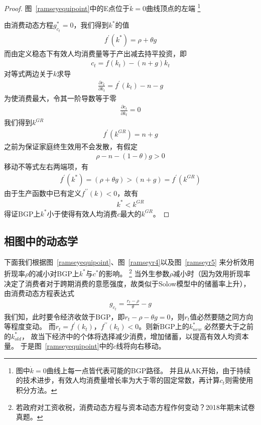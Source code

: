 \documentclass[cn,normal,11pt,black]{elegantnote}
\begin{document}
\begin{proof}{图~\ref{ramseyequipoint}中的E点位于$\dot{k} = 0$曲线顶点的左端}
        \footnote{图中$\dot{k} =0$曲线上每一点皆代表可能的BGP路径。
        并且从AK开始，由于持续的技术进步，有效人均消费量增长率为大于零的固定常数，再计算$c_t$则需使用积分方法。}

    由消费动态方程$g_{c_t}^* =0$，我们得到$k^*$的值
    \begin{align*}
        f^\prime(k^*) = \rho + \theta g
    \end{align*}
    而由定义稳态下有效人均消费量等于产出减去持平投资，即
    \begin{align*}
        c_t = f(k_t) - (n+g)k_t
    \end{align*}
    对等式两边关于$k$求导
    \begin{align*}
        \frac{\partial c_t}{\partial k_t} = f^\prime(k_t) - n - g
    \end{align*}
    为使消费最大，令其一阶导数等于零
    \begin{align*}
        \frac{\partial c_t}{\partial k_t} = 0
    \end{align*}
    我们得到$k^{GR}$
    \begin{align*}
        f^\prime(k^{GR}) = n+g
    \end{align*}
    之前为保证家庭终生效用不会发散，有假定
    \begin{align*}
        \rho - n - (1-\theta)g >0
    \end{align*}
    移动不等式左右两端项，有
    \begin{align*}
        f^\prime(k^*) = (\rho + \theta g) > (n+g) = f^\prime(k^{GR})
    \end{align*}
    由于生产函数中已有定义$f^{\prime \prime}(k) < 0$，故有
    \begin{align*}
        k^* < k^{GR}
    \end{align*}
    得证BGP上$k^*$小于使得有效人均消费$c$最大的$k^{GR}$。
\end{proof}

\subsection{相图中的动态学}
 
下面我们根据图~\ref{ramseyequipoint}、图~\ref{ramseyr4}以及图~\ref{ramseyr5}
来分析效用折现率$\rho$的减小对BGP上$k^*$与$c^*$的影响。
\footnote{若政府对工资收税，消费动态方程与资本动态方程作何变动？2018年期末试卷真题。}
当外生参数$\rho$减小时（因为效用折现率决定了消费者对于跨期消费的意愿强度，故类似于Solow模型中的储蓄率上升），
由消费动态方程表达式
\begin{align*}
    g_{c_t} = \frac{r_t - \rho}{\theta} - g
\end{align*}
我们知，此时要令经济收敛于BGP，即$r_t - \rho - \theta g = 0$，则$r_t$值必然要随之同方向等程度变动。
而$r_t = f^\prime(k_t)$，$f^{\prime \prime}(k_t) <0$。则新BGP上的$k^*_{new}$ 必然要大于之前的$k^*_{old}$，
故当下经济中的个体将选择减少消费，增加储蓄，以提高有效人均资本量。
于是图~\ref{ramseyequipoint}中的$\dot{c}$线将向右移动。
\end{document}
